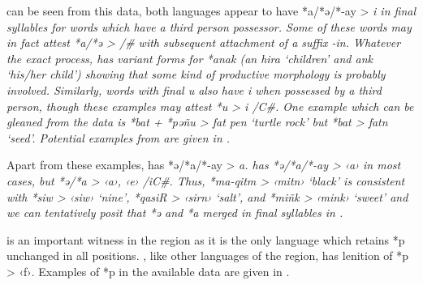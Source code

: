  can be seen from this data,
both languages appear to have *a/*ə/*-ay > \it{i} in final syllables
for words which have a third person possessor.
Some of these words may in fact attest *a/*ə > {\0} /{\gap}{\#}
with subsequent attachment of a suffix \it{-in}.
Whatever the exact process,
 has variant forms for *anak (\it{an hira} ‘children’
and \it{ank} ‘his/her child’) showing that
some kind of productive morphology is probably involved.
Similarly, words with final \it{u} also have \it{i}
when possessed by a third person,
though these examples may attest *u > \it{i} /{\gap}C{\#}.
One example which can be gleaned from the  data is *bat
+ *pəñu > \it{fat pen} ‘turtle rock’ but *bat > \it{fatn} ‘seed'.
Potential examples from  are given in .


Apart from these examples,
 has *ə/*a/*-ay > \it{a}.
 has *ə/*a/*-ay > ‹a› in most cases,
but *ə/*a > ‹a›, ‹e› /iC{\gap}{\#}.
Thus,  *ma-qitm > ‹mitn› ‘black’ is consistent
with *siw > ‹siw› ‘nine’,
*qasiR > ‹sirn› ‘salt’,
and *miñk > ‹mink› ‘sweet’
and we can tentatively posit that *ə
and *a merged in final syllables in .

 is an important witness in the region as it is the only language
which retains *p unchanged in all positions.
, like other languages of the region,
has lenition of *p > ‹f›.
Examples of *p in the available data are given in .

